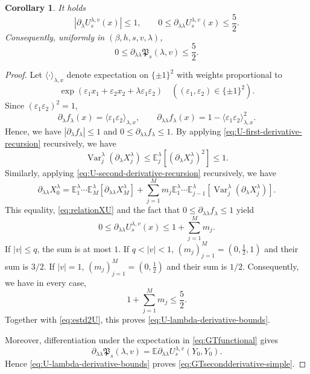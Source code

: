 \documentclass[11pt]{article}
\newtheorem{corollary}[theorem]{Corollary}
\numberwithin{equation}{section}
\newcommand{\E}{\mathbb{E}}
\newcommand{\1}{\mathbf 1}
\begin{document}
\begin{corollary}\label{cor: technical lemma for U and Psi}
It holds
    \begin{equation}
\left|\partial_\lambda U_s^{\lambda,v}(x)\right|\le1,
\qquad
0\le
\partial_{\lambda\lambda}U_s^{\lambda,v}(x)
\le\frac52.
\label{eq:U-lambda-derivative-bounds}
\end{equation}
Consequently, uniformly in $(\beta,h,s,v,\lambda)$,
\begin{equation}
0\leq \partial_{\lambda\lambda}\mathfrak P_s(\lambda,v)\leq \frac52.
 \label{eq:GTsecondderivative-simple}
\end{equation}
\end{corollary}
\begin{proof}
Let $\langle\cdot\rangle_{\lambda,x}$ denote expectation on
$\{\pm1\}^2$ with weights proportional to
\[
 \exp(\varepsilon_1x_1+\varepsilon_2x_2
             +\lambda\varepsilon_1\varepsilon_2) \quad ( (\varepsilon _1 , \varepsilon _2) \in \{ \pm 1 \} ^2 ).
\]
Since $(\varepsilon_1\varepsilon_2)^2=1$,
\[
 \partial_\lambda f_\lambda(x)
 =\langle\varepsilon_1\varepsilon_2\rangle_{\lambda,x},
 \qquad
 \partial_{\lambda\lambda}f_\lambda(x)
 =1-\langle\varepsilon_1\varepsilon_2\rangle_{\lambda,x}^2.
\]
Hence, we have $|\partial_\lambda f_\lambda|\le1$ and
$0\le\partial_{\lambda\lambda}f_\lambda\le1$.
By applying \eqref{eq:U-first-derivative-recursion} recursively, we have
\[
 \operatorname{Var}_j^\lambda(\partial_\lambda X_j^\lambda)
 \le \E_j^\lambda[(\partial_\lambda X_j^\lambda)^2]
 \le1.
\]
Similarly, applying \eqref{eq:U-second-derivative-recursion} recursively, we have 
\[
\partial_{\lambda\lambda}X_0^\lambda = \E_1^\lambda \cdots \E_M^\lambda
\left[
\partial_{\lambda\lambda}X_M^\lambda
\right]
+
\sum _{j=1}^M m_j
\E_1^\lambda \cdots \E_{j-1}^\lambda \left[ \operatorname{Var}_j^\lambda
\left(
\partial_\lambda X_j^\lambda
\right) \right] .
\]
This equality, \eqref{eq:relationXU} and the fact that $0\le\partial_{\lambda\lambda}f_\lambda\le1$ yield
\begin{equation}\label{eq:estd2U}
 0\le\partial_{\lambda\lambda}U_s^{\lambda,v}(x)
 \le1+\sum_{j=1}^Mm_j.
\end{equation}
If $|v|\le q$, the sum is at most $1$.  If
$q<|v|<1$, $(m_j)_{j=1}^M = ( 0,\frac12,1)$ and their sum is $3/2$.
If $|v|=1$, $(m_j)_{j=1}^M = ( 0,\frac12)$ and their sum is $1/2$.
Consequently, we have in every case,
\[
 1+\sum_{j=1}^Mm_j\le\frac52.
\]
Together with \eqref{eq:estd2U}, this proves
\eqref{eq:U-lambda-derivative-bounds}.

Moreover, differentiation under the expectation in
\eqref{eq:GTfunctional}
gives
\[
 \partial_{\lambda\lambda}\mathfrak P_s(\lambda,v)
 =\E\partial_{\lambda\lambda}
   U_s^{\lambda,v}(Y_0,Y_0).
\]
Hence \eqref{eq:U-lambda-derivative-bounds} proves
\eqref{eq:GTsecondderivative-simple}.
\end{proof}
\end{document}
